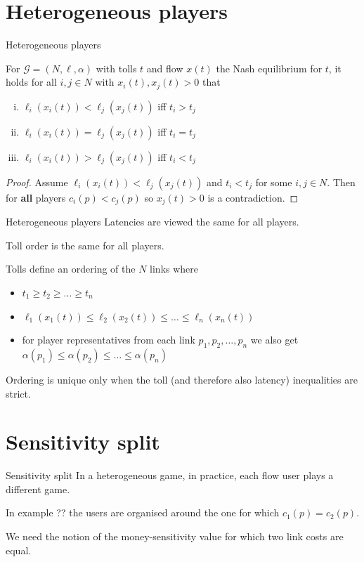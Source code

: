 \documentclass{beamer}
\newcommand{\Gm}{\mathcal{G}}
\begin{document}
\section{Heterogeneous players}

\begin{frame}{Heterogeneous players}
	\begin{lemma}
		For $\Gm = (N, \ell, \alpha)$ with tolls $t$ and flow $x(t)$ the Nash equilibrium for $t$, it holds for all $i, j \in N$ with $x_i(t), x_j(t) > 0$ that
		\begin{enumerate}[(i)]
			\item $\ell_i(x_i(t)) < \ell_j(x_j(t))$ iff $t_i > t_j$
			\item $\ell_i(x_i(t)) = \ell_j(x_j(t))$ iff $t_i = t_j$
			\item $\ell_i(x_i(t)) > \ell_j(x_j(t))$ iff $t_i < t_j$
		\end{enumerate}
	\end{lemma}
	\begin{proof}
		Assume $\ell_i(x_i(t)) < \ell_j(x_j(t))$ and $t_i < t_j$ for some $i, j \in N$.
		Then for \textbf{all} players $c_i(p) < c_j(p)$ so $x_j(t) > 0$ is a contradiction.
	\end{proof}
\end{frame}

\begin{frame}{Heterogeneous players}
	Latencies are viewed the same for all players.

	Toll order is the same for all players.

	Tolls define an ordering of the $N$ links where
	\begin{itemize}
		\item $t_1 \ge t_2 \ge \dots \ge t_n$
		\item $\ell_1(x_1(t)) \le \ell_2(x_2(t)) \le \dots \le \ell_n(x_n(t))$
		\item for player representatives from each link $p_1, p_2, \dots, p_n$ we also get $\alpha(p_1) \le \alpha(p_2) \le \dots \le \alpha(p_n)$
	\end{itemize}
	Ordering is unique only when the toll (and therefore also latency) inequalities are strict.
\end{frame}


\section{Sensitivity split}

\begin{frame}{Sensitivity split}
	In a heterogeneous game, in practice, each flow user plays a different game.

	In example ?? the users are organised around the one for which $c_1(p) = c_2(p)$.

	We need the notion of the money-sensitivity value for which two link costs are equal.
\end{frame}
\end{document}
